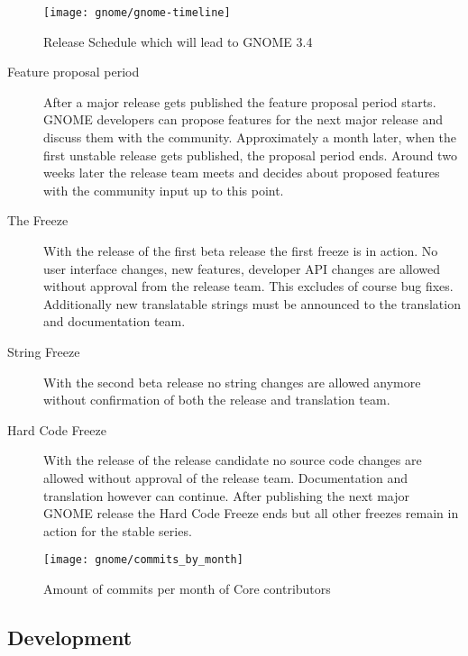 \begin{figure}[htbp]
  \centering
  \texttt{[image: gnome/gnome-timeline]}
  \caption{Release Schedule which will lead to GNOME 3.4}
\end{figure}

\begin{description}

  \item[Feature proposal period] After a major release gets published the
    feature proposal period starts. GNOME developers can propose features for
    the next major release and discuss them with the community. Approximately a
    month later, when the first unstable release gets published, the proposal
    period ends. Around two weeks later the release team meets and decides
    about proposed features with the community input up to this point.

  \item[The Freeze] With the release of the first beta release the first freeze
    is in action. No user interface changes, new features, developer API
    changes are allowed without approval from the release team. This excludes
    of course bug fixes. Additionally new translatable strings must be
    announced to the translation and documentation team.

  \item[String Freeze] With the second beta release no string changes are
    allowed anymore without confirmation of both the release and translation
    team.

  \item[Hard Code Freeze] With the release of the release candidate no source
    code changes are allowed without approval of the release team.
    Documentation and translation however can continue. After publishing the
    next major GNOME release the Hard Code Freeze ends but all other freezes
    remain in action for the stable series.

\end{description}

\begin{figure}[htbp]
  \centering
  \texttt{[image: gnome/commits\_by\_month]}
  \caption{Amount of commits per month of Core contributors}
\end{figure}


\subsection{Development} %

